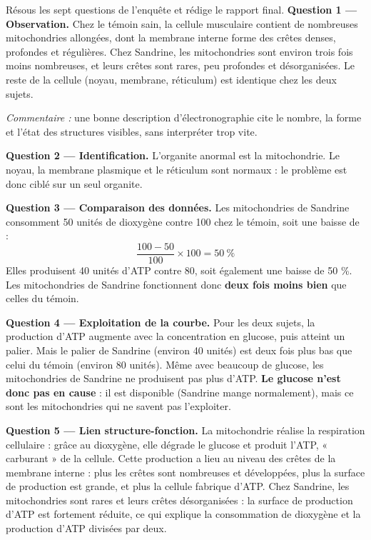 \documentclass[11pt]{article}
\newcommand{\cle}[1]{{\popxbold\color{popdark}#1}}
\newcounter{popsec}
\newcounter{popsub}
\newcommand{\courssub}[1]{%
  \stepcounter{popsub}%
  \par\vspace{9pt}\noindent{\popxbold\fontsize{11.5}{13}\selectfont\color{popink}{\color{poporange}\thepopsec.\thepopsub}\hspace{6pt}#1}\par\nopagebreak\vspace{4pt}
}
\begin{document}
\courssub{Démarche et corrigé commenté}

\begin{exoresolu}
Résous les sept questions de l'enquête et rédige le rapport final.
\tcblower
\textbf{Question 1 — Observation.} Chez le témoin sain, la cellule musculaire contient de nombreuses mitochondries allongées, dont la membrane interne forme des crêtes denses, profondes et régulières. Chez Sandrine, les mitochondries sont environ trois fois moins nombreuses, et leurs crêtes sont rares, peu profondes et désorganisées. Le reste de la cellule (noyau, membrane, réticulum) est identique chez les deux sujets.

\emph{Commentaire :} une bonne description d'électronographie cite le nombre, la forme et l'état des structures visibles, sans interpréter trop vite.

\textbf{Question 2 — Identification.} L'organite anormal est la \cle{mitochondrie}. Le noyau, la membrane plasmique et le réticulum sont normaux : le problème est donc ciblé sur un seul organite.

\textbf{Question 3 — Comparaison des données.} Les mitochondries de Sandrine consomment 50 unités de dioxygène contre 100 chez le témoin, soit une baisse de :
\[ \frac{100-50}{100}\times 100 = 50\ \% \]
Elles produisent 40 unités d'ATP contre 80, soit également une baisse de 50 \%. Les mitochondries de Sandrine fonctionnent donc \textbf{deux fois moins bien} que celles du témoin.

\textbf{Question 4 — Exploitation de la courbe.} Pour les deux sujets, la production d'ATP augmente avec la concentration en glucose, puis atteint un \cle{palier}. Mais le palier de Sandrine (environ 40 unités) est deux fois plus bas que celui du témoin (environ 80 unités). Même avec beaucoup de glucose, les mitochondries de Sandrine ne produisent pas plus d'ATP. \textbf{Le glucose n'est donc pas en cause} : il est disponible (Sandrine mange normalement), mais ce sont les mitochondries qui ne savent pas l'exploiter.

\textbf{Question 5 — Lien structure-fonction.} La mitochondrie réalise la respiration cellulaire : grâce au dioxygène, elle dégrade le glucose et produit l'ATP, « carburant » de la cellule. Cette production a lieu au niveau des \cle{crêtes} de la membrane interne : plus les crêtes sont nombreuses et développées, plus la surface de production est grande, et plus la cellule fabrique d'ATP. Chez Sandrine, les mitochondries sont rares et leurs crêtes désorganisées : la surface de production d'ATP est fortement réduite, ce qui explique la consommation de dioxygène et la production d'ATP divisées par deux.


\end{exoresolu}
\end{document}
